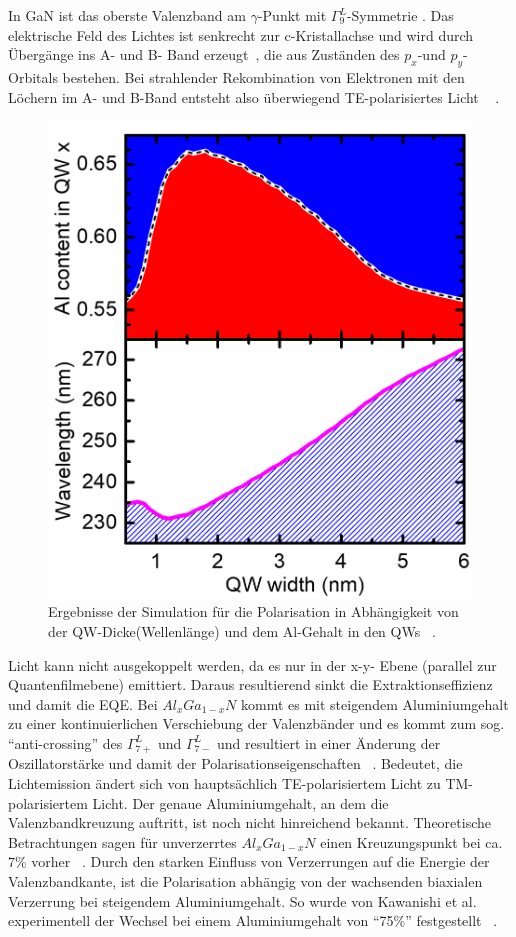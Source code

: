 In GaN ist das oberste Valenzband am $\gamma$-Punkt mit $\Gamma^{L}_{9}$-Symmetrie . Das elektrische Feld des Lichtes ist senkrecht zur c-Kristallachse und wird durch Übergänge ins A- und B- Band erzeugt~\cite{doi:10.1063/1.3574025}, die aus Zuständen des $p_x$-und $p_y$-Orbitals bestehen. Bei strahlender Rekombination von Elektronen mit den Löchern im A- und B-Band entsteht also überwiegend TE-polarisiertes Licht ~\cite{doi:10.1063/1.3574025} . 
%
\begin{figure}[htb]
  \centering
  \begin{minipage}{\linewidth}
      \centering
      \includegraphics[width=0.4\linewidth]{Bilder/christophPolarisationSimu1.png}
      \caption{Ergebnisse der Simulation für die Polarisation in Abhängigkeit von der QW-Dicke(Wellenlänge) und dem Al-Gehalt in den QWs ~\cite{doi:10.1063/1.4932651}.}
      \label{fig:simu1chr}
  \end{minipage}
\end{figure}
%
Licht kann nicht ausgekoppelt werden, da es nur in der x-y- Ebene (parallel zur Quantenfilmebene) emittiert. Daraus resultierend sinkt die Extraktionseffizienz und damit die EQE. Bei $Al_{x}Ga_{1-x}N$ kommt es mit steigendem Aluminiumgehalt zu einer kontinuierlichen Verschiebung der Valenzbänder und es kommt zum sog. "`anti-crossing"' des $\Gamma^{L}_{7+}$ und $\Gamma^{L}_{7-}$ und resultiert in einer Änderung der Oszillatorstärke und damit der Polarisationseigenschaften ~\cite{doi:10.1063/1.4932651}.
Bedeutet, die Lichtemission ändert sich von hauptsächlich TE-polarisiertem Licht zu TM-polarisiertem Licht. Der genaue Aluminiumgehalt, an dem die Valenzbandkreuzung auftritt, ist noch nicht hinreichend bekannt. Theoretische Betrachtungen sagen für unverzerrtes $Al_{x}Ga_{1-x}N$ einen Kreuzungspunkt bei ca. $7\%$ vorher ~\cite{doi:10.1063/1.3675451}. Durch den starken Einfluss von Verzerrungen auf die Energie der  Valenzbandkante, ist die Polarisation abhängig von der wachsenden biaxialen Verzerrung bei steigendem Aluminiumgehalt. So wurde von Kawanishi et al. experimentell der Wechsel bei einem Aluminiumgehalt von "`75\%"' festgestellt ~\cite{doi:10.1063/1.2410242}. 
